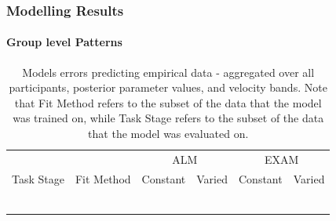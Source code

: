\documentclass[
  12pt,
  letterpaper,
]{article}
\begin{document}
\subsubsection{Modelling Results}\label{modelling-results}

\paragraph{Group level Patterns}\label{group-level-patterns}

\begin{longtable}{lcrrrr}

\caption{\label{tbl-htw-modelError-e1}Models errors predicting empirical
data - aggregated over all participants, posterior parameter values, and
velocity bands. Note that Fit Method refers to the subset of the data
that the model was trained on, while Task Stage refers to the subset of
the data that the model was evaluated on.}

\tabularnewline

\toprule
 &  & \multicolumn{2}{c}{ALM} & \multicolumn{2}{c}{EXAM} \\ 
\cmidrule(lr){3-4} \cmidrule(lr){5-6}
Task Stage & Fit Method & Constant & Varied & Constant & Varied \\ 
\midrule\addlinespace[2.5pt]
\cellcolor[HTML]{FFFFFF}{Test} & \cellcolor[HTML]{FFFFFF}{Fit to Test Data} & \cellcolor[HTML]{FFFFFF}{$199.93$} & \cellcolor[HTML]{FFFFFF}{$103.36$} & \cellcolor[HTML]{FFFFFF}{$104.01$} & \cellcolor[HTML]{FFFFFF}{$85.68$} \\ 
\cellcolor[HTML]{FFFFFF}{Test} & \cellcolor[HTML]{FFFFFF}{Fit to Test \& Training Data} & \cellcolor[HTML]{FFFFFF}{$216.97$} & \cellcolor[HTML]{FFFFFF}{$170.28$} & \cellcolor[HTML]{FFFFFF}{$127.94$} & \cellcolor[HTML]{FFFFFF}{$144.86$} \\ 
\cellcolor[HTML]{FFFFFF}{Test} & \cellcolor[HTML]{FFFFFF}{Fit to Training Data} & \cellcolor[HTML]{FFFFFF}{$467.73$} & \cellcolor[HTML]{FFFFFF}{$291.38$} & \cellcolor[HTML]{FFFFFF}{$273.30$} & \cellcolor[HTML]{FFFFFF}{$297.91$} \\ 
\cellcolor[HTML]{FFFFFF}{Train} & \cellcolor[HTML]{FFFFFF}{Fit to Test Data} & \cellcolor[HTML]{FFFFFF}{$297.82$} & \cellcolor[HTML]{FFFFFF}{$2,016.01$} & \cellcolor[HTML]{FFFFFF}{$53.90$} & \cellcolor[HTML]{FFFFFF}{$184.00$} \\ 
\cellcolor[HTML]{FFFFFF}{Train} & \cellcolor[HTML]{FFFFFF}{Fit to Test \& Training Data} & \cellcolor[HTML]{FFFFFF}{$57.40$} & \cellcolor[HTML]{FFFFFF}{$132.32$} & \cellcolor[HTML]{FFFFFF}{$42.92$} & \cellcolor[HTML]{FFFFFF}{$127.90$} \\ 
\cellcolor[HTML]{FFFFFF}{Train} & \cellcolor[HTML]{FFFFFF}{Fit to Training Data} & \cellcolor[HTML]{FFFFFF}{$51.77$} & \cellcolor[HTML]{FFFFFF}{$103.48$} & \cellcolor[HTML]{FFFFFF}{$51.43$} & \cellcolor[HTML]{FFFFFF}{$107.03$} \\ 
\bottomrule

\end{longtable}
\end{document}
